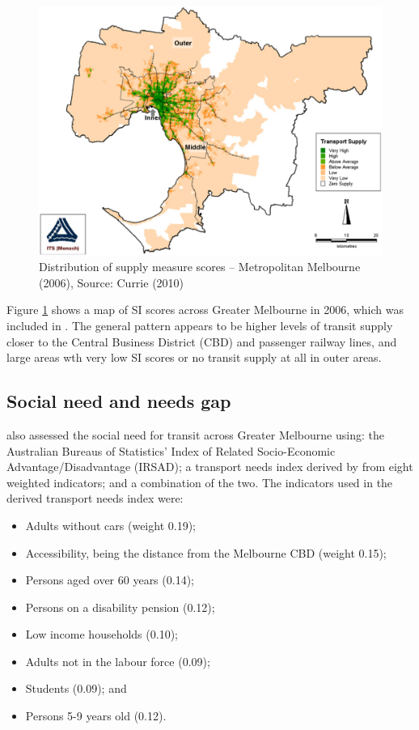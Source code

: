 \documentclass[preprint, 3p,
authoryear]{elsarticle} %
\providecommand{\tightlist}{%
  \setlength{\itemsep}{0pt}\setlength{\parskip}{0pt}}
\begin{document}
\begin{figure}
\includegraphics[width=1\linewidth]{graphics/Currie2010SI} \caption{Distribution of supply measure scores – Metropolitan Melbourne (2006), Source: Currie (2010)}\label{fig:Currie_map_SI}
\end{figure}

Figure \ref{fig:Currie_map_SI} shows a map of SI scores across Greater
Melbourne in 2006, which was included in \citet{currie2010identifying}.
The general pattern appears to be higher levels of transit supply closer
to the Central Business District (CBD) and passenger railway lines, and
large areas wth very low SI scores or no transit supply at all in outer
areas.

\hypertarget{social-need-and-needs-gap}{%
\subsection{Social need and needs gap}\label{social-need-and-needs-gap}}

\citet{currie2010identifying} also assessed the social need for transit
across Greater Melbourne using: the Australian Bureaus of Statistics'
Index of Related Socio-Economic Advantage/Disadvantage (IRSAD); a
transport needs index derived by \citet{currie2010identifying} from
eight weighted indicators; and a combination of the two. The indicators
used in the derived transport needs index were:

\begin{itemize}
\tightlist
\item
  Adults without cars (weight 0.19);
\item
  Accessibility, being the distance from the Melbourne CBD (weight
  0.15);
\item
  Persons aged over 60 years (0.14);
\item
  Persons on a disability pension (0.12);
\item
  Low income households (0.10);
\item
  Adults not in the labour force (0.09);
\item
  Students (0.09); and
\item
  Persons 5-9 years old (0.12).
\end{itemize}
\end{document}
